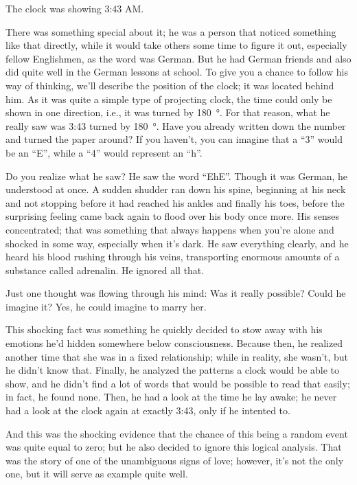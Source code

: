 The clock was showing 3:43 AM.

There was something special about it; he was a person that noticed something like that directly, while it would take others some time to figure it out, especially fellow Englishmen, as the word was German. But he had German friends and also did quite well in the German lessons at school. To give you a chance to follow his way of thinking, we'll describe the position of the clock; it was located behind him. As it was quite a simple type of projecting clock, the time could only be shown in one direction, i.e., it was turned by \SI{180}{\degree}. For that reason, what he really saw was 3:43 turned by \SI{180}{\degree}. 
Have you already written down the number and turned the paper around? If you haven't, you can imagine that a \enquote{3} would be an \enquote{E}, while a \enquote{4} would represent an \enquote{h}.

Do you realize what he saw?
He saw the word \enquote{EhE}.
Though it was German, he understood at once. 
A sudden shudder ran down his spine, beginning at his neck and not stopping before it had reached his ankles and finally his toes, before the surprising feeling came back again to flood over his body once more. His senses concentrated; that was something that always happens when you're alone and shocked in some way, especially when it's dark. He saw everything clearly, and he heard his blood rushing through his veins, transporting enormous amounts of a substance called adrenalin. 
He ignored all that.

Just one thought was flowing through his mind: Was it really possible? Could he imagine it?
Yes, he could imagine to marry her.

This shocking fact was something he quickly decided to stow away with his emotions he'd hidden somewhere below consciousness. 
Because then, he realized another time that she was in a fixed relationship; while in reality, she wasn't, but he didn't know that. 
Finally, he analyzed the patterns a clock would be able to show, and he didn't find a lot of words that would be possible to read that easily; in fact, he found none. Then, he had a look at the time he lay awake; he never had a look at the clock again at exactly 3:43, only if he intented to.

And this was the shocking evidence that the chance of this being a random event was quite equal to zero; but he also decided to ignore this logical analysis. 
That was the story of one of the unambiguous signs of love; however, it's not the only one, but it will serve as example quite well.

